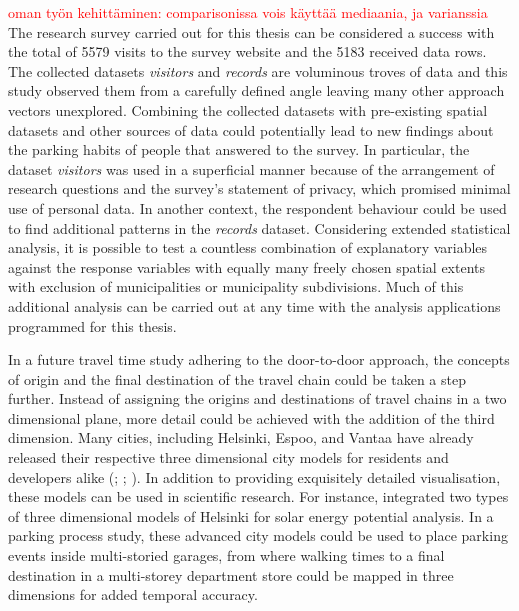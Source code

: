 \textcolor{red}{oman työn kehittäminen: comparisonissa vois käyttää mediaania, ja varianssia} \\
The research survey carried out for this thesis can be considered a success with the total of 5579 visits to the survey website and the 5183 received data rows. The collected datasets \textit{visitors} and \textit{records} are voluminous troves of data and this study observed them from a carefully defined angle leaving many other approach vectors unexplored. Combining the collected datasets with pre-existing spatial datasets and other sources of data could potentially lead to new findings about the parking habits of people that answered to the survey. In particular, the dataset \textit{visitors} was used in a superficial manner because of the arrangement of research questions and the survey's statement of privacy, which promised minimal use of personal data. In another context, the respondent behaviour could be used to find additional patterns in the \textit{records} dataset. Considering extended statistical analysis, it is possible to test a countless combination of explanatory variables against the response variables with equally many freely chosen spatial extents with exclusion of municipalities or municipality subdivisions. Much of this additional analysis can be carried out at any time with the analysis applications programmed for this thesis.

In a future travel time study adhering to the door-to-door approach, the concepts of origin and the final destination of the travel chain could be taken a step further. Instead of assigning the origins and destinations of travel chains in a two dimensional plane, more detail could be achieved with the addition of the third dimension. Many cities, including Helsinki, Espoo, and Vantaa have already released their respective three dimensional city models for residents and developers alike (\cite{Helsinginkaupunginkaupunginkanslia2020}; \cite{Espoonkaupungintekninen2018}; \cite{Vantaankaupunki2018}). In addition to providing exquisitely detailed visualisation, these models can be used in scientific research. For instance,  integrated two types of three dimensional models of Helsinki for solar energy potential analysis. In a parking process study, these advanced city models could be used to place parking events inside multi-storied garages, from where walking times to a final destination in a multi-storey department store could be mapped in three dimensions for added temporal accuracy.

